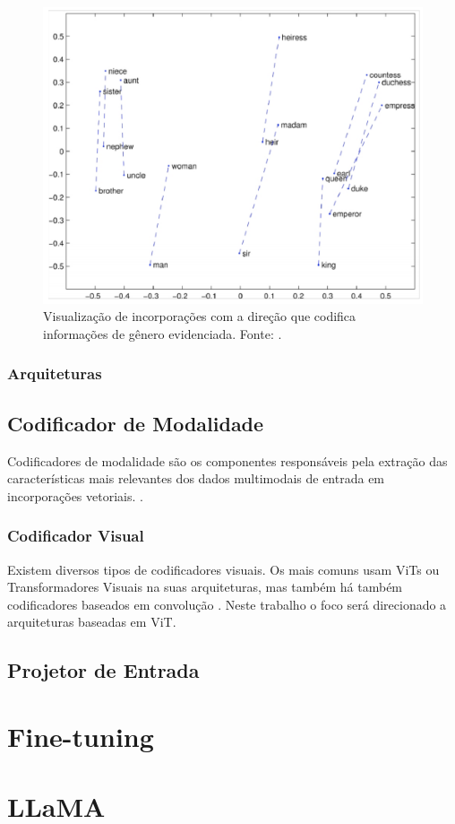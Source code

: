 \begin{figure}[ht]
      \centering
      \includegraphics[width=0.7\columnwidth,keepaspectratio]{images/word_embeddings_directions.png}
      \caption{\small Visualização de incorporações com a direção que codifica informações de gênero evidenciada. Fonte: \textcite{word_embedding}.}
      \label{fig:word_embeddings_directions}
\end{figure}
\clearpage  %

\subsubsection{Arquiteturas}

\subsection{Codificador de Modalidade}

Codificadores de modalidade são os componentes responsáveis pela extração das características mais relevantes dos dados multimodais de entrada em incorporações vetoriais.
\cite{mllm_survey_2024}.

\subsubsection{Codificador Visual}

Existem diversos tipos de codificadores visuais. Os mais comuns usam \acp{ViT} ou Transformadores Visuais na suas arquiteturas, mas também há também codificadores
baseados em convolução \cite{mllm_survey_2023}. Neste trabalho o foco será direcionado a arquiteturas baseadas em \ac{ViT}.


\subsection{Projetor de Entrada}

\section{Fine-tuning}

\section{LLaMA}
